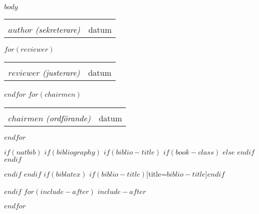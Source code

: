 \documentclass[$if(fontsize)$$fontsize$,$endif$$if(lang)$$babel-lang$,$endif$$if(papersize)$$papersize$,$endif$twoside,$for(classoption)$$classoption$$sep$,$endfor$]{$documentclass$}
\newcommand{\placeEmptyLines}[1]{%
  \mbox{}%

  \vspace{#1\baselineskip}%
}
\newcommand{\SignatureAndDate}[2]{%
  \placeEmptyLines{4}
  \begin{tabular}{ll}%
    \makebox[7cm]{\hrulefill} & \makebox[2.5in]{\hrulefill}\\%
    #1 \textit{(#2)}&datum\\%
  \end{tabular}%
  \newline
}
\begin{document}
%
%
$body$


%
%
\begin{minipage}{\textwidth}
\SignatureAndDate{$author$}{sekreterare}
$for(reviewer)${\SignatureAndDate{$reviewer$}{justerare}}$endfor$
$for(chairmen)${\SignatureAndDate{$chairmen$}{ordförande}}$endfor$
\end{minipage}



$if(natbib)$
$if(bibliography)$
$if(biblio-title)$
$if(book-class)$
\renewcommand\bibname{$biblio-title$}
$else$
\renewcommand\refname{$biblio-title$}
$endif$
$endif$


$endif$
$endif$
$if(biblatex)$
\printbibliography$if(biblio-title)$[title=$biblio-title$]$endif$

$endif$
$for(include-after)$
$include-after$

$endfor$
\end{document}
